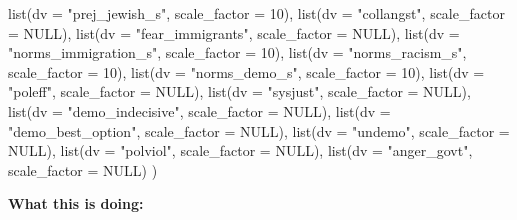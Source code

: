 \documentclass[
  letterpaper,
  DIV=11,
  numbers=noendperiod]{scrreprt}
\newenvironment{Shaded}{\begin{snugshade}}{\end{snugshade}}
\newcommand{\AttributeTok}[1]{\textcolor[rgb]{0.40,0.45,0.13}{#1}}
\newcommand{\ConstantTok}[1]{\textcolor[rgb]{0.56,0.35,0.01}{#1}}
\newcommand{\DecValTok}[1]{\textcolor[rgb]{0.68,0.00,0.00}{#1}}
\newcommand{\FunctionTok}[1]{\textcolor[rgb]{0.28,0.35,0.67}{#1}}
\newcommand{\NormalTok}[1]{\textcolor[rgb]{0.00,0.23,0.31}{#1}}
\newcommand{\StringTok}[1]{\textcolor[rgb]{0.13,0.47,0.30}{#1}}
\begin{document}
\begin{Shaded}
\begin{Highlighting}[]
  \FunctionTok{list}\NormalTok{(}\AttributeTok{dv =} \StringTok{"prej\_jewish\_s"}\NormalTok{,           }\AttributeTok{scale\_factor =} \DecValTok{10}\NormalTok{),}
  \FunctionTok{list}\NormalTok{(}\AttributeTok{dv =} \StringTok{"collangst"}\NormalTok{,               }\AttributeTok{scale\_factor =} \ConstantTok{NULL}\NormalTok{),}
  \FunctionTok{list}\NormalTok{(}\AttributeTok{dv =} \StringTok{"fear\_immigrants"}\NormalTok{,         }\AttributeTok{scale\_factor =} \ConstantTok{NULL}\NormalTok{),}
  \FunctionTok{list}\NormalTok{(}\AttributeTok{dv =} \StringTok{"norms\_immigration\_s"}\NormalTok{,     }\AttributeTok{scale\_factor =} \DecValTok{10}\NormalTok{),}
  \FunctionTok{list}\NormalTok{(}\AttributeTok{dv =} \StringTok{"norms\_racism\_s"}\NormalTok{,          }\AttributeTok{scale\_factor =} \DecValTok{10}\NormalTok{),}
  \FunctionTok{list}\NormalTok{(}\AttributeTok{dv =} \StringTok{"norms\_demo\_s"}\NormalTok{,            }\AttributeTok{scale\_factor =} \DecValTok{10}\NormalTok{),}
  \FunctionTok{list}\NormalTok{(}\AttributeTok{dv =} \StringTok{"poleff"}\NormalTok{,                  }\AttributeTok{scale\_factor =} \ConstantTok{NULL}\NormalTok{),}
  \FunctionTok{list}\NormalTok{(}\AttributeTok{dv =} \StringTok{"sysjust"}\NormalTok{,                 }\AttributeTok{scale\_factor =} \ConstantTok{NULL}\NormalTok{),}
  \FunctionTok{list}\NormalTok{(}\AttributeTok{dv =} \StringTok{"demo\_indecisive"}\NormalTok{,         }\AttributeTok{scale\_factor =} \ConstantTok{NULL}\NormalTok{),}
  \FunctionTok{list}\NormalTok{(}\AttributeTok{dv =} \StringTok{"demo\_best\_option"}\NormalTok{,        }\AttributeTok{scale\_factor =} \ConstantTok{NULL}\NormalTok{),}
  \FunctionTok{list}\NormalTok{(}\AttributeTok{dv =} \StringTok{"undemo"}\NormalTok{,                  }\AttributeTok{scale\_factor =} \ConstantTok{NULL}\NormalTok{),}
  \FunctionTok{list}\NormalTok{(}\AttributeTok{dv =} \StringTok{"polviol"}\NormalTok{,                 }\AttributeTok{scale\_factor =} \ConstantTok{NULL}\NormalTok{),}
  \FunctionTok{list}\NormalTok{(}\AttributeTok{dv =} \StringTok{"anger\_govt"}\NormalTok{,              }\AttributeTok{scale\_factor =} \ConstantTok{NULL}\NormalTok{)}
\NormalTok{)}
\end{Highlighting}
\end{Shaded}

\textbf{What this is doing:}
\end{document}
